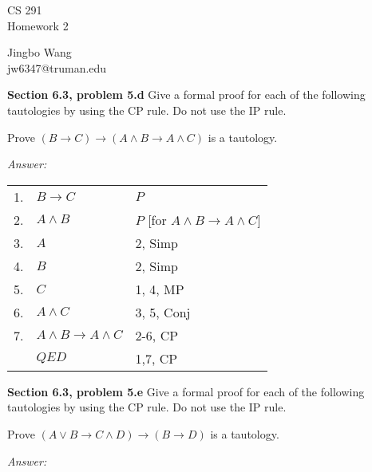 \documentclass[12pt]{article}
\begin{document}
\begin{center}
{\large CS 291}\\
Homework 2
\end{center}

\begin{flushright}
Jingbo Wang\\
jw6347@truman.edu \\
\end{flushright}


\textbf{Section 6.3, problem 5.d}  Give a formal proof for each of the
following tautologies by using the CP rule. Do not use the IP rule.

Prove $(B \rightarrow C) \rightarrow (A \land B \rightarrow A\land C)$ is a tautology.

\emph{Answer:} 

\begin{tabular}{p{.8cm}p{8.5cm}l}
1. & $B \rightarrow C$ & $P$ \\
2. & \qquad $A \land B$   & $P$ [for $A \land B \rightarrow A \land C] $ \\
3. & \qquad $A$ & 2, Simp  \\
4. & \qquad $B$ & 2, Simp \\
5. & \qquad $C$ & 1, 4, MP \\
6. & \qquad $A \land C$ & 3, 5, Conj \\
7. & $A \land B \rightarrow A \land C$ & 2-6, CP \\
& $QED$ & 1,7, CP \\
\end{tabular}

\textbf{Section 6.3, problem 5.e}  Give a formal proof for each of the
following tautologies by using the CP rule. Do not use the IP rule.

Prove $(A \lor B \rightarrow C \land D) \rightarrow (B \rightarrow D)$ is a tautology.

\emph{Answer:} 
\end{document}
